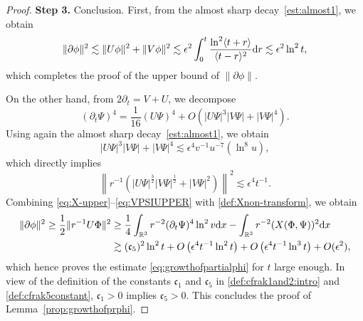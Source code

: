 \documentclass[a4paper,reqno]{amsart}
\theoremstyle{definition}
\numberwithin{equation}{section}
\def \R {{\mathbb{R} }}
\def \d {{\rm{d}}}
\def \pt{\partial_{t}}
\def\cfrak{\mathfrak{c}}
\def\ep{\epsilon}
\begin{document}
\begin{proof}
\textbf{Step 3.} Conclusion. 
First, from the almost sharp decay~\eqref{est:almost1}, we obtain 
\begin{equation*}
    \|\partial \phi\|^{2}\lesssim \|U\phi\|^{2}+\|V\phi\|^{2}
    \lesssim \ep^{2} \int_{0}^{t}\frac{\ln^{2}\langle t+r\rangle}{\langle t-r\rangle^{2}}\d r\lesssim \ep^{2}\ln^{2}t,
\end{equation*}
which completes the proof of the upper bound of $\|\partial \phi\|$.

\smallskip
On the other hand, from $2\partial_{t}=V+U$, we decompose
\begin{equation*}
    (\partial_{t}\Psi)^{4}=\frac{1}{16}(U\Psi)^{4}+O\left(|U\Psi|^{3}|V\Psi|+|V\Psi|^{4}\right).
\end{equation*}
Using again the almost sharp decay~\eqref{est:almost1}, we obtain
\begin{equation*}
    |U\Psi|^{3} |V\Psi|+|V\Psi|^{4}
    \lesssim \epsilon^{4}v^{-1}u^{-7}(\ln^{8}u),
\end{equation*}
which directly implies 
\begin{equation}\label{eq:VPSIUPPER}
  \left\|r^{-1}\left(|U\Psi|^{\frac{3}{2}}|V\Psi|^{\frac{1}{2}}+|V\Psi|^{2}\right)\right\|^{2}\lesssim \epsilon^{4}t^{-1}.
\end{equation}
Combining \eqref{eq:X-upper}--\eqref{eq:VPSIUPPER} with \eqref{def:Xnon-transform}, we obtain
\begin{equation*}
\begin{aligned}
  \|\partial \phi\|^{2}\ge  \frac{1}{2} \|r^{-1}U\Phi\|^{2}&\ge \frac{1}{4}\int_{\R^{3}}r^{-2}(\pt\Psi)^{4}\ln^{2}v\d x-\int_{\R^{3}}r^{-2}(X(\Phi,\Psi))^{2}\d x\\
    &\gtrsim (\mathfrak{c}_{5})^{2}\ln^{2}t
    +O\left(\ep^{4}t^{-1}\ln^{2}t\right)
+O\left(\ep^{4}t^{-1}\ln^{3}t\right)+O(\ep^{2}),
    \end{aligned}
\end{equation*}
which hence proves the estimate \eqref{eq:growthofpartialphi} for $t$ large enough.
In view of the definition of the constants $\cfrak_1$ and $\cfrak_5$ in \eqref{def:cfrak1and2:intro} and \eqref{def:cfrak5constant}, $\cfrak_1>0$ implies $\cfrak_5>0$. This concludes the proof of Lemma~\ref{prop:growthofprphi}.
\end{proof}
\end{document}
